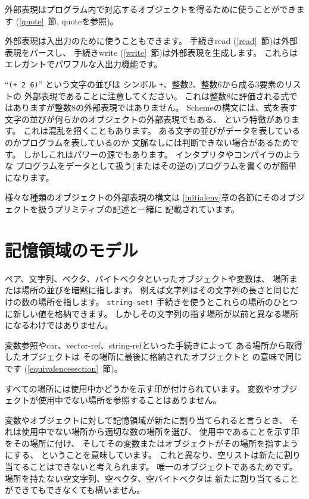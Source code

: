 外部表現はプログラム内で対応するオブジェクトを得るために使うことができます
(\ref{quote}~節, {\cf quote}を参照)。

外部表現は入出力のために使うこともできます。
手続き{\cf read} (\ref{read}~節)は外部表現をパースし、
手続き{\cf write} (\ref{write}~節)は外部表現を生成します。
これらはエレガントでパワフルな入出力機能です。

``{\tt(+ 2 6)}'' という文字の並びは
シンボル {\tt +}、整数2、整数6から成る3要素のリストの
外部表現であることに注意してください。
これは整数8に評価される式ではありますが整数8の外部表現ではありません。
Schemeの構文には、式を表す文字の並びが何らかのオブジェクトの外部表現でもある、
という特徴があります。
これは混乱を招くこともあります。
ある文字の並びがデータを表しているのかプログラムを表しているのか
文脈なしには判断できない場合があるためです。
しかしこれはパワーの源でもあります。
インタプリタやコンパイラのような
プログラムをデータとして扱う(またはその逆の)プログラムを書くのが簡単になります。

様々な種類のオブジェクトの外部表現の構文は
\ref{initialenv}章の各節にそのオブジェクトを扱うプリミティブの記述と一緒に
記載されています。

\section{記憶領域のモデル}
\label{storagemodel}

ペア、文字列、ベクタ、バイトベクタといったオブジェクトや変数は、
場所または場所の並びを暗黙に指します。
例えば文字列はその文字列の長さと同じだけの数の場所を指します。
{\tt string-set!} 手続きを使うとこれらの場所のひとつに新しい値を格納できます。
しかしその文字列の指す場所が以前と異なる場所になるわけではありません。

変数参照や{\cf car}、{\cf vector-ref}、{\cf string-ref}といった手続きによって
ある場所から取得したオブジェクトは
その場所に最後に格納されたオブジェクトと の意味で同じです
(\ref{equivalencesection}~節)。

すべての場所には使用中かどうかを示す印が付けられています。
変数やオブジェクトが使用中でない場所を参照することはありません。

変数やオブジェクトに対して記憶領域が新たに割り当てられると言うとき、
それは使用中でない場所から適切な数の場所を選び、
使用中であることを示す印をその場所に付け、
そしてその変数またはオブジェクトがその場所を指すようにする、
ということを意味しています。
これと異なり、空リストは新たに割り当てることはできないと考えられます。
唯一のオブジェクトであるためです。
場所を持たない空文字列、空ベクタ、空バイトベクタは
新たに割り当てることができてもできなくても構いません。

